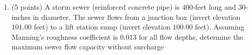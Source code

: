 \documentclass[12pt]{article}
\begin{document}
\begin{enumerate}
%
\clearpage
\item (5 points)  A storm sewer (reinforced concrete pipe) is 400-feet long and 30-inches in diameter.  The sewer flows from a junction box (invert elevation $101.00$ feet) to a lift station sump (invert elevation $100.00$ feet).  Assuming Manning's roughness coefficient is $0.013$ for all flow depths, determine the maximum sewer  flow capacity without surcharge 




\end{enumerate}
\end{document}
